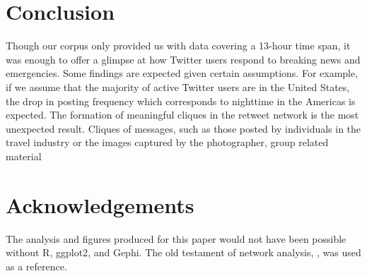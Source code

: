 \documentclass[a4paper, 11pt, titlepage]{article}
\begin{document}
\section{Conclusion}

Though our corpus only provided us with data covering a 13-hour time span, it was enough to offer a glimpse at how Twitter users respond to breaking news and emergencies.  Some findings are expected given certain assumptions.  For example, if we assume that the majority of active Twitter users are in the United States, the drop in posting frequency which corresponds to nighttime in the Americas is expected.  The formation of meaningful cliques in the retweet network is the most unexpected result.  Cliques of messages, such as those posted by individuals in the travel industry or the images captured by the photographer, group related material

\section{Acknowledgements}

The analysis and figures produced for this paper would not have been possible without R\cite{R}, ggplot2\cite{wickham2008ggplot2, wickham2009ggplot2}, and Gephi\cite{bastian2009gephi}.
The old testament of network analysis, \cite{wasserman1994sna}, was used as a reference.



\end{document}
